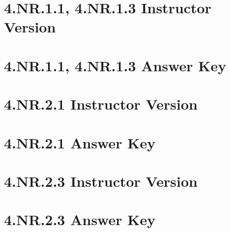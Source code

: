 \documentclass[a4paper,12pt]{article}
\title{}
\date{}
\begin{document}

\hypertarget{toc}{}  %
\tableofcontents
\newpage



\pagestyle{fancy}  %

\newpage
\section{4.NR.1.1, 4.NR.1.3 Instructor Version}


\newpage
\section{4.NR.1.1, 4.NR.1.3 Answer Key}


\newpage
\section{4.NR.2.1 Instructor Version}


\newpage
\section{4.NR.2.1 Answer Key}


\newpage
\section{4.NR.2.3 Instructor Version}


\newpage
\section{4.NR.2.3 Answer Key}

\end{document}
